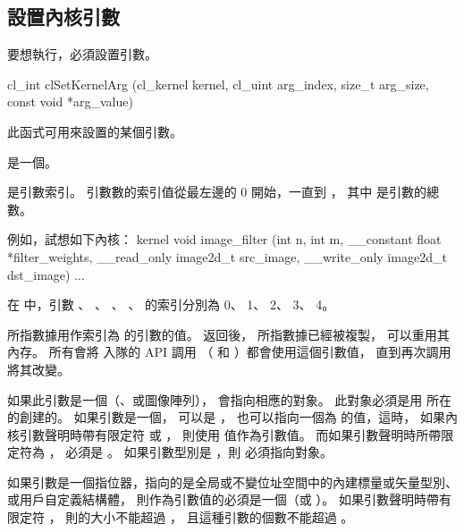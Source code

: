 \subsection{設置內核引數}

要想執行，必須設置引數。


\startCLFUNC
cl_int clSetKernelArg (cl_kernel kernel,
			cl_uint arg_index,
			size_t arg_size,
			const void *arg_value)
\stopCLFUNC

此函式可用來設置的某個引數。

 是一個。

 是引數索引。
引數數的索引值從最左邊的 0 開始，一直到 ，
其中  是引數的總數。

例如，試想如下內核：
\startclc
kernel void
image_filter (int n, int m,
		__constant float *filter_weights,
		__read_only image2d_t src_image,
		__write_only image2d_t dst_image)
{
	...
}
\stopclc

在  中，引數 、 、 、
、  的索引分別為 0、 1、 2、 3、 4。

 所指數據用作索引為  的引數的值。
 返回後，  所指數據已經被複製，
可以重用其內存。
所有會將  入隊的 API 調用
（  和 ）都會使用這個引數值，
直到再次調用  將其改變。

如果此引數是一個（、或圖像陣列），
 會指向相應的對象。
此對象必須是用  所在的創建的。
如果引數是一個，  可以是 ，
也可以指向一個為  的值，這時，
如果內核引數聲明時帶有限定符  或 ，
則使用  值作為引數值。
而如果引數聲明時所帶限定符為 ，  必須是 。
如果引數型別是 ，則  必須指向對象。

如果引數是一個指位器，指向的是全局或不變位址空間中的內建標量或矢量型別、或用戶自定義結構體，
則作為引數值的必須是一個（或 ）。
如果引數聲明時帶有限定符 ，
則的大小不能超過 ，
且這種引數的個數不能超過 。

